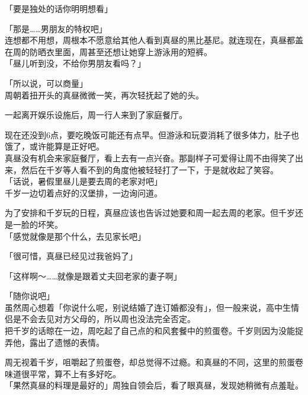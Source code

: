 「要是独处的话你明明想看」

「那是……男朋友的特权吧」\\

连想都不用想，周根本不愿意给其他人看到真昼的黑比基尼。就连现在，真昼都盖在周的防晒衣里面，周甚至还想让她穿上游泳用的短裤。\\

「昼儿听到没，不给你男朋友看吗？」

「所以说，可以商量」\\

周朝着扭开头的真昼微微一笑，再次轻抚起了她的头。\\

\vspace{2\baselineskip}

一起离开娱乐设施后，周一行人来到了家庭餐厅。

现在还没到6点，要吃晚饭可能还有点早。但游泳和玩耍消耗了很多体力，肚子也饿了，或许能算是正好吧。\\

真昼没有机会来家庭餐厅，看上去有一点兴奋。那副样子可爱得让周不由得笑了出来，然后在千岁等人看不到的角度他被轻轻打了一下，于是就收起了笑容。\\

「话说，暑假里昼儿是要去周的老家对吧」\\

千岁一边切着点好的汉堡排，一边询问道。

为了安排和千岁玩的日程，真昼应该也告诉过她要和周一起去周的老家。但千岁还是一脸的坏笑。\\

「感觉就像是那个什么，去见家长吧」

「很可惜，真昼已经见过我爸妈了」

「这样啊～……就像是跟着丈夫回老家的妻子啊」

「随你说吧」\\

虽然周心想着「你说什么呢，别说结婚了连订婚都没有」，但一般来说，高中生情侣是不会去见对方父母的，所以周也没法完全否定。\\

把千岁的话晾在一边，周吃起了自己点的和风套餐中的煎蛋卷。千岁则因为没能捉弄他，露出了遗憾的表情。

周无视着千岁，咀嚼起了煎蛋卷，却总觉得不过瘾。和真昼的不同，这里的煎蛋卷味道很平常，算不上有多好吃。\\

「果然真昼的料理是最好的」周独自领会后，看了眼真昼，发现她稍微有点羞耻。

